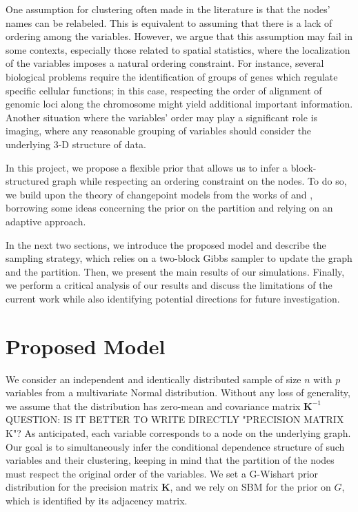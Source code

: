 One assumption for clustering often made in the literature is that the nodes' names can be relabeled. This is equivalent to assuming that there is a lack of ordering among the variables. However, we argue that this assumption may fail in some contexts, especially those related to spatial statistics, where the localization of the variables imposes a natural ordering constraint. For instance, several biological problems require the identification of groups of genes which regulate specific cellular functions; in this case, respecting the order of alignment of genomic loci along the chromosome might yield additional important information. Another situation where the variables' order may play a significant role is imaging, where any reasonable grouping of variables should consider the underlying 3-D structure of data.

In this project, we propose a flexible prior that allows us to infer a block-structured graph while respecting an ordering constraint on the nodes. To do so, we build upon the theory of changepoint models from the works of \textcite{bensonAdaptiveMCMCMultiple2018} and \textcite{martinezNonparametricChangePoint2014}, borrowing some ideas concerning the prior on the partition and relying on an adaptive approach. 

In the next two sections, we introduce the proposed model and describe the sampling strategy, which relies on a two-block Gibbs sampler to update the graph and the partition. Then, we present the main results of our simulations. Finally, we perform a critical analysis of our results and discuss the limitations of the current work while also identifying potential directions for future investigation.


\section{Proposed Model}

We consider an independent and identically distributed sample of size $n$ with $p$ variables from a multivariate Normal distribution. Without any loss of generality, we assume that the distribution has zero-mean and covariance matrix $\mathbf{K}^{-1}$ QUESTION: IS IT BETTER TO WRITE DIRECTLY "PRECISION MATRIX K"? As anticipated, each variable corresponds to a node on the underlying graph. Our goal is to simultaneously infer the conditional dependence structure of such variables and their clustering, keeping in mind that the partition of the nodes must respect the original order of the variables. We set a G-Wishart prior distribution for the precision matrix $\mathbf{K}$, and we rely on SBM for the prior on $G$, which is identified by its adjacency matrix.

